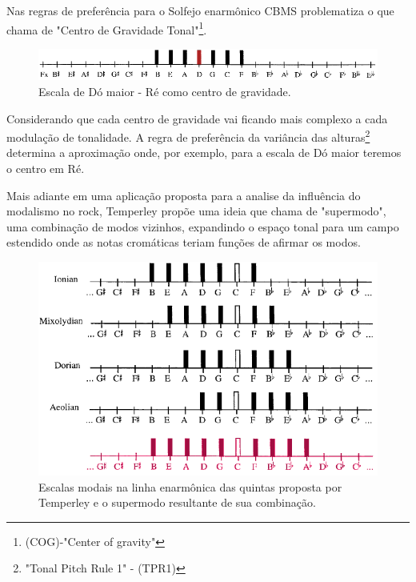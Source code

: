 \documentclass[
	12pt,				%
	openright,			%
	twoside,			%
	a4paper,			%
	english,			%
	french,				%
	spanish,			%
	brazil				%
	]{abntex2}
\begin{document}
\pagebreak
Nas regras de preferência para o Solfejo enarmônico  CBMS problematiza o que chama de "Centro de Gravidade Tonal"\footnote{(COG)-"Center of gravity"\cite[ p.125]{temperley2004cognition}}.

\begin{figure}[!h]
	\caption{\label{fig_grafico}Escala de Dó maior - Ré como centro de gravidade. }
	\begin{center}
	    \includegraphics[scale=0.6]{CBMS/COG_re_lineoffifths.png}
	\end{center}
\end{figure}


Considerando que cada centro de gravidade vai ficando mais complexo a cada modulação de tonalidade. A regra de preferência da variância das alturas\footnote{"Tonal Pitch Rule 1" - (TPR1)\cite[ p.125]{temperley2004cognition}} determina a aproximação onde, por exemplo, para a escala de Dó maior teremos o centro em Ré.


Mais adiante em uma aplicação proposta para a analise da influência do modalismo no rock, Temperley propõe uma ideia que chama de "supermodo", uma combinação de modos vizinhos, expandindo o espaço tonal para um campo estendido onde as notas cromáticas teriam funções de afirmar os modos.

\begin{figure}[!h]
	\caption{\label{fig_grafico}Escalas modais na linha enarmônica das quintas proposta por Temperley e o supermodo resultante de sua combinação. }
	\begin{center}
	    \includegraphics[scale=0.6]{CBMS/modosrockgregos_temperley.png}
	\end{center}
\end{figure}
\end{document}
